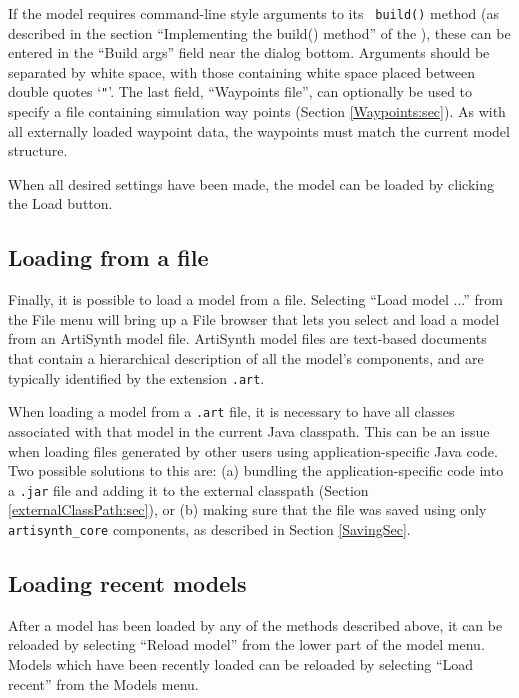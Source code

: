 \documentclass{article}
\begin{document}
If the model requires command-line style arguments to its {\tt
build()} method (as described in the section ``Implementing the
build() method'' of the ), these can be entered in the {\sf ``Build args''}
field near the dialog bottom.  Arguments should be separated by white
space, with those containing white space placed between double
quotes `{\tt "}'.  The last field, {\sf ``Waypoints file''}, can
optionally be used to specify a file containing simulation way points
(Section \ref{Waypoints:sec}).  As with all externally loaded waypoint data, the
waypoints must match the current model structure.

When all desired settings have been made, the model can be loaded by
clicking the {\sf Load} button.

\subsection{Loading from a file}
\label{LoadingByFile:sec}

Finally, it is possible to load a model from a file.  Selecting {\sf
``Load model ...''} from the {\sf File} menu will bring up a File browser
that lets you select and load a model from an ArtiSynth model file.
ArtiSynth model files are text-based documents that contain a
hierarchical description of all the model's components, and are
typically identified by the extension {\tt .art}.

\begin{sideblock}
When loading a model from a {\tt .art} file, it is necessary to have
all classes associated with that model in the current Java classpath.
This can be an issue when loading files generated by other users using
application-specific Java code. Two possible solutions to this are:
(a) bundling the application-specific code into a {\tt .jar} file and
adding it to the external classpath (Section
\ref{externalClassPath:sec}), or (b) making sure that the file was
saved using only {\tt artisynth\_core} components, as described in
Section \ref{SavingSec}.
\end{sideblock}

\subsection{Loading recent models}
\label{LoadingRecent:sec}

After a model has been loaded by any of the methods described above,
it can be reloaded by selecting {\sf ``Reload model''} from the lower part
of the model menu. Models which have been recently loaded can be
reloaded by selecting {\sf ``Load recent''} from the {\sf Models} menu.
\end{document}
